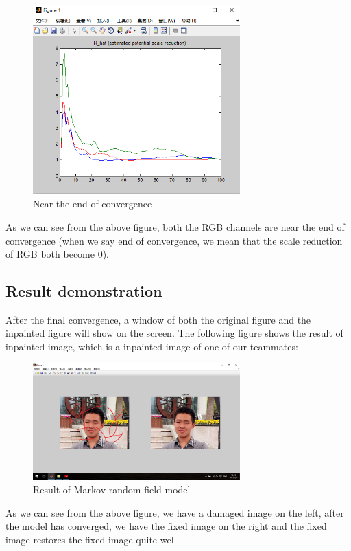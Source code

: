 \begin{figure}[H]
\centering
\includegraphics[width=8cm]{mrf_cov.png}
\caption{Near the end of convergence}
\end{figure}

As we can see from the above figure, both the RGB channels are near the end of convergence (when we say end of convergence, we mean that the scale reduction of RGB both become 0).

\subsection{Result demonstration}
After the final convergence, a window of both the original figure and the inpainted figure will show on the screen. The following figure shows the result of inpainted image, which is a inpainted image of one of our teammates:

\begin{figure}[H]
\centering
\includegraphics[width=8cm]{mrf_res.png}
\caption{Result of Markov random field model}
\end{figure}

As we can see from the above figure, we have a damaged image on the left, after the model has converged, we have the fixed image on the right and the fixed image restores the fixed image quite well.


